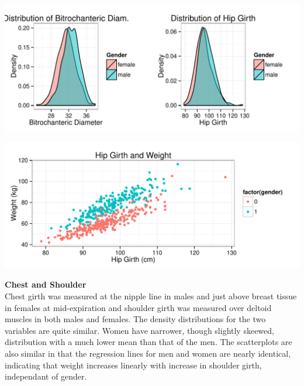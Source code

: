 \documentclass[11pt]{article}\usepackage[]{graphicx}\usepackage[]{color}
\makeatletter
\def\maxwidth{ %
  \ifdim\Gin@nat@width>\linewidth
    \linewidth
  \else
    \Gin@nat@width
  \fi
}
\newenvironment{knitrout}{}{} %
\makeatother
\begin{document}
\begin{knitrout}
\color{fgcolor}
\includegraphics[width=\maxwidth]{figure/hip_plots} 

\end{knitrout}



\begin{knitrout}
\color{fgcolor}
\includegraphics[width=\maxwidth]{figure/hipgirth_plot} 

\end{knitrout}



\newpage

\textbf{Chest and Shoulder}\\ %
   
Chest girth was measured at the nipple line in males and just above breast tissue in females at mid-expiration and shoulder girth was measured over deltoid muscles in both males and females. The density distributions for the two variables are quite similar. Women have narrower, though slightly skeewed, distribution with a much lower mean than that of the men. The scatterplots are also similar in that the regression lines for men and women are nearly identical, indicating that weight increases linearly with increase in shoulder girth, independant of gender.
\end{document}
